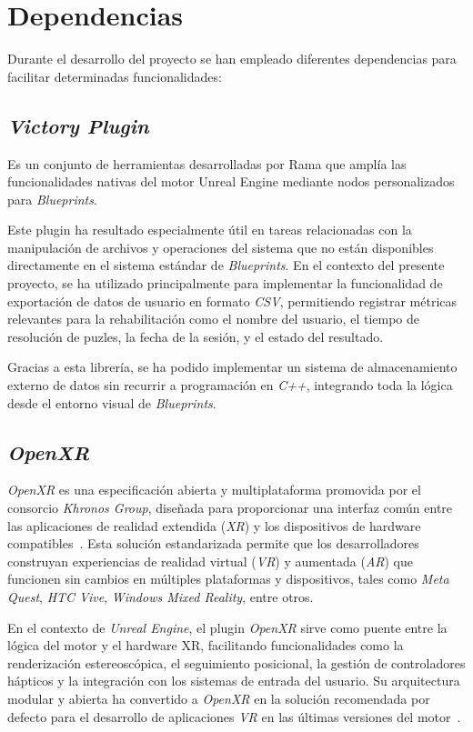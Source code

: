 \section{Dependencias}
Durante el desarrollo del proyecto se han empleado diferentes dependencias para facilitar determinadas funcionalidades:

\subsection{\textit{\textbf{Victory Plugin}}} Es un conjunto de herramientas desarrolladas por Rama que amplía las funcionalidades nativas del motor Unreal Engine mediante nodos personalizados para \textit{Blueprints}.

Este plugin ha resultado especialmente útil en tareas relacionadas con la manipulación de archivos y operaciones del sistema que no están disponibles directamente en el sistema estándar de \textit{Blueprints}. En el contexto del presente proyecto, se ha utilizado principalmente para implementar la funcionalidad de exportación de datos de usuario en formato \textit{CSV}, permitiendo registrar métricas relevantes para la rehabilitación como el nombre del usuario, el tiempo de resolución de puzles, la fecha de la sesión, y el estado del resultado.

Gracias a esta librería, se ha podido implementar un sistema de almacenamiento externo de datos sin recurrir a programación en \textit{C++}, integrando toda la lógica desde el entorno visual de \textit{Blueprints}.

\subsection {\textit{OpenXR}}

\textit{OpenXR} es una especificación abierta y multiplataforma promovida por el consorcio \textit{Khronos Group}, diseñada para proporcionar una interfaz común entre las aplicaciones de realidad extendida (\textit{XR}) y los dispositivos de hardware compatibles~\cite{khronos-openxr}. Esta solución estandarizada permite que los desarrolladores construyan experiencias de realidad virtual (\textit{VR}) y aumentada (\textit{AR}) que funcionen sin cambios en múltiples plataformas y dispositivos, tales como \textit{Meta Quest}, \textit{HTC Vive}, \textit{Windows Mixed Reality}, entre otros.

En el contexto de \textit{Unreal Engine}, el plugin \textit{OpenXR} sirve como puente entre la lógica del motor y el hardware XR, facilitando funcionalidades como la renderización estereoscópica, el seguimiento posicional, la gestión de controladores hápticos y la integración con los sistemas de entrada del usuario. Su arquitectura modular y abierta ha convertido a \textit{OpenXR} en la solución recomendada por defecto para el desarrollo de aplicaciones \textit{VR} en las últimas versiones del motor~\cite{unreal-openxr}.

